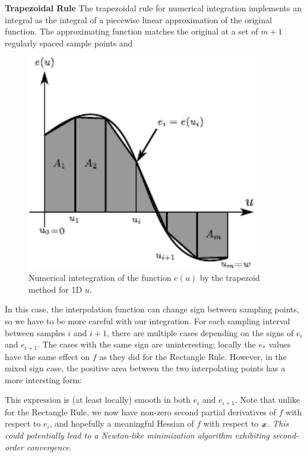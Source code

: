 \documentclass[12pt,journal,draftcls,letterpaper,onecolumn]{IEEEtran}
\begin{document}
{\bf Trapezoidal Rule}  The trapezoidal rule for numerical integration implements an integral as the integral of a piecewise linear approximation of the original function.  The approximating function matches the original at a set of $m+1$ regularly spaced sample points and 
\begin{figure}[htb]
 \centering
 \includegraphics[width=4in]{integration_trapezoid.pdf}
 \caption{Numerical intetegration of the function $e(u)$ by the trapezoid method for 1D $u$.}
 \label{fig:trapezoid}
\end{figure}


In this case, the interpolation function can change sign between sampling points, so we have to be more careful with our integration.  For each sampling interval between samples $i$ and $i+1$, there are multiple cases depending on the signs of $e_i$ and $e_{i+1}$.  The cases with the same sign are uninteresting; locally the $e_*$ values have the same effect on $f$ as they did for the Rectangle Rule.  However, in the mixed sign case, the positive area between the two interpolating points has a more intersting form:


This expression is (at least locally) smooth in both $e_i$ and $e_{i+1}$.  Note that unlike for the Rectangle Rule, we now have non-zero second partial derivatives of $f$ with respect to $e_i$, and hopefully a meaningful Hessian of $f$ with respect to ${\boldsymbol{x}}$.  {\em This could potentially lead to a Newton-like minimization algorithm exhibiting second-order convergence}.  
\end{document}
